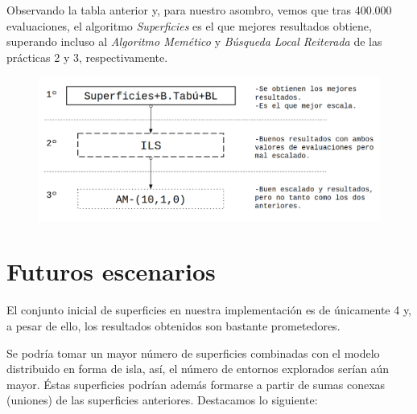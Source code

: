 \hfill \break

Observando la tabla anterior y, para nuestro asombro, vemos que tras 400.000 evaluaciones, el  algoritmo \textit{Superficies} es el que mejores resultados obtiene, superando incluso al \textit{Algoritmo Memético} y  \textit{Búsqueda Local Reiterada} de las prácticas 2 y 3, respectivamente.

	\begin{figure}[H]
	\centering
	\includegraphics[scale=0.33]{img/final.png}
\end{figure}







\newpage 
\section{Futuros escenarios}

El conjunto inicial de superficies en nuestra implementación es de únicamente 4 y, a pesar de ello, los resultados obtenidos son bastante prometedores.

Se podría tomar un mayor número de superficies combinadas con el modelo distribuido en forma de isla, así, el número de entornos explorados serían aún mayor. Éstas superficies podrían además formarse a partir de sumas conexas (uniones) de las superficies anteriores. Destacamos lo siguiente:

